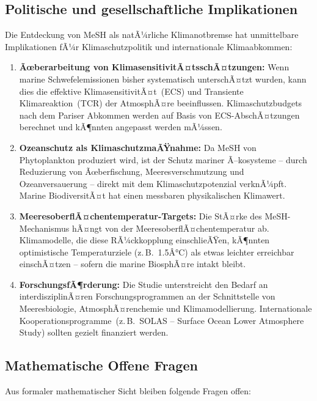 ﻿\documentclass[a4paper,12pt]{article}
\theoremstyle{definition}
\begin{document}
\subsection{Politische und gesellschaftliche Implikationen}

Die Entdeckung von MeSH als natÃ¼rliche Klimanotbremse hat unmittelbare Implikationen fÃ¼r
Klimaschutzpolitik und internationale Klimaabkommen:

\begin{enumerate}
  \item \textbf{Ãœberarbeitung von KlimasensitivitÃ¤tsschÃ¤tzungen:} Wenn marine Schwefelemissionen
        bisher systematisch unterschÃ¤tzt wurden, kann dies die effektive KlimasensitivitÃ¤t~(ECS)
        und Transiente Klimareaktion~(TCR) der AtmosphÃ¤re beeinflussen. Klimaschutzbudgets nach
        dem Pariser Abkommen werden auf Basis von ECS-AbschÃ¤tzungen berechnet und kÃ¶nnten
        angepasst werden mÃ¼ssen.
  \item \textbf{Ozeanschutz als KlimaschutzmaÃŸnahme:} Da MeSH von Phytoplankton produziert wird,
        ist der Schutz mariner Ã–kosysteme -- durch Reduzierung von Ãœberfischung, Meeresverschmutzung
        und Ozeanversauerung -- direkt mit dem Klimaschutzpotenzial verknÃ¼pft. Marine BiodiversitÃ¤t
        hat einen messbaren physikalischen Klimawert.
  \item \textbf{MeeresoberflÃ¤chentemperatur-Targets:} Die StÃ¤rke des MeSH-Mechanismus hÃ¤ngt von
        der MeeresoberflÃ¤chentemperatur ab. Klimamodelle, die diese RÃ¼ckkopplung einschlieÃŸen,
        kÃ¶nnten optimistische Temperaturziele (z.\,B.\ 1.5Â°C) als etwas leichter erreichbar
        einschÃ¤tzen -- sofern die marine BiosphÃ¤re intakt bleibt.
  \item \textbf{ForschungsfÃ¶rderung:} Die Studie unterstreicht den Bedarf an interdisziplinÃ¤ren
        Forschungsprogrammen an der Schnittstelle von Meeresbiologie, AtmosphÃ¤renchemie und
        Klimamodellierung. Internationale Kooperationsprogramme~(z.\,B.\ SOLAS -- Surface Ocean
        Lower Atmosphere Study) sollten gezielt finanziert werden.
\end{enumerate}

\subsection{Mathematische Offene Fragen}

Aus formaler mathematischer Sicht bleiben folgende Fragen offen:
\end{document}
